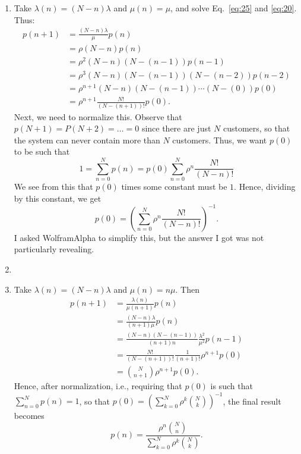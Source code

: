 \begin{question}
    \begin{solution}
      \begin{enumerate}
      \item 
Take $\lambda(n) = (N-n)\lambda$ and $\mu(n) = \mu$, and solve
    Eq.~\eqref{eq:25} and \eqref{eq:20}.  Thus: 
    \begin{equation*}
      \begin{split}
       p(n+1) 
& = \frac{(N-n)\lambda}\mu p(n) \\
& = \rho (N-n) p(n) \\
& = \rho^2 (N-n)(N-(n-1))p(n-1) \\
& = \rho^3 (N-n)(N-(n-1))(N-(n-2)) p(n-2) \\
& = \rho^{n+1} (N-n)(N-(n-1))\cdots(N-(0)) p(0) \\
&= \rho^{n+1} \frac{N!}{(N-(n+1))!}p(0). 
      \end{split}
    \end{equation*}
    Next, we need to normalize this. Observe that
    $p(N+1)=P(N+2) = \ldots = 0$ since there are just $N$ customers,
    so that the system can never contain more than $N$
    customers. Thus, we want $p(0)$ to be such that
\begin{equation*}
  1 = \sum_{n=0}^N p(n) = p(0) \sum_{n=0}^N \rho^n \frac{N!}{(N-n)!}
\end{equation*}
We see from this that $p(0)$ times some constant must be $1$. Hence, dividing by this constant, we get 
\begin{equation*}
  p(0) = \left(\sum_{n=0}^N \rho^n \frac{N!}{(N-n)!}\right)^{-1}.
\end{equation*}
I asked WolframAlpha to simplify this, but the answer I got was not particularly revealing. 
\item 
      \TBD
    \item  Take $\lambda(n) = (N-n)\lambda$ and $\mu(n) = n \mu$. Then 
    \begin{equation*}
      \begin{split}
      p(n+1) 
&= \frac{\lambda(n)}{\mu(n+1)} p(n) \\
&= \frac{(N-n)\lambda}{(n+1)\mu} p(n) \\
&= \frac{(N-n)(N-(n-1))}{(n+1)n}\frac{\lambda^2}{\mu^2} p(n-1) \\
&= \frac{N!}{(N-(n+1))!}\frac1{(n+1)!}\rho^{n+1} p(0) \\
&  = {N \choose n+1}\rho^{n+1} p(0).
      \end{split}
    \end{equation*}
    Hence, after normalization, i.e., requiring that $p(0)$ is such
    that $\sum_{n=0}^N p(n) = 1$, so that $p(0) = \left(\sum_{k=0}^N \rho^k { N \choose k} \right)^{-1}$, the final result becomes
\begin{equation*}
  p(n) = \frac{\rho^n {N \choose n}}{\sum_{k=0}^N \rho^k {N \choose k}}.
\end{equation*}
  \end{enumerate}
    \end{solution}
\end{question}

